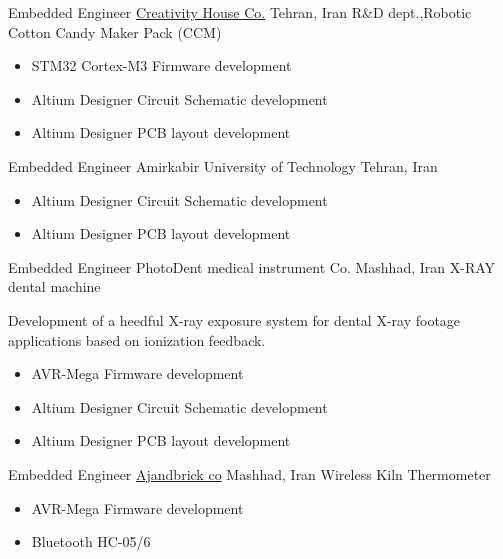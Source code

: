 	{Embedded Engineer}
	{\href{https://www.instagram.com/creativityhouse.ir/}{\color{blue}Creativity House Co.}}
        {Tehran, Iran}
	{
         \newline
         R\&D dept.,Robotic Cotton Candy Maker Pack (CCM) }
         {
         \begin{itemize}
            \item STM32 Cortex-M3 Firmware development
            \item Altium Designer Circuit Schematic development
            \item Altium Designer  PCB layout development
         \end{itemize}
         }


    {Embedded Engineer}
    {Amirkabir University of Technology}
    {Tehran, Iran}
    {
    \newline
    \href{https://phee.aut.ac.ir/en}{\color{blue}{Physics and Energy Faculty}}}
    {
    \begin{itemize}
        \item Altium Designer Circuit Schematic development
        \item Altium Designer  PCB layout development
    \end{itemize}
     }
     
	{Embedded Engineer}
	{PhotoDent medical instrument Co.}
        {Mashhad, Iran}
	{
         \newline
         X-RAY dental machine
         }
        { Development of a heedful X-ray exposure system for dental X-ray footage applications based on ionization feedback.
        \begin{itemize}
            \item AVR-Mega Firmware development
            \item Altium Designer Circuit Schematic development
            \item Altium Designer  PCB layout development 
        \end{itemize}
        }
	{Embedded Engineer}
	{\href{http://ajandbrick.co/}{\color{blue}Ajandbrick co}}
        {Mashhad, Iran}
	{
         \newline
         Wireless Kiln Thermometer}
         {
         \begin{itemize}
             \item AVR-Mega Firmware development
             \item Bluetooth HC-05/6
         \end{itemize}
         }

